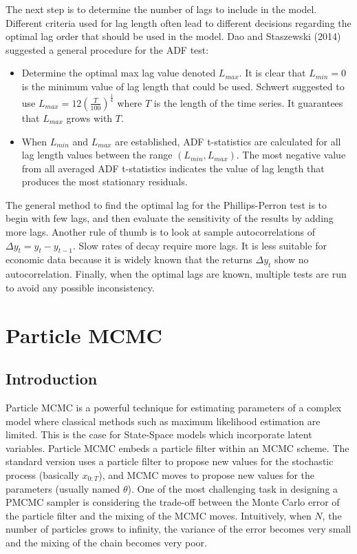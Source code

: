 \documentclass[11pt,a4,twosided,singlespacing,titlepagenumber=on]{scrreprt}
\numberwithin{equation}{chapter} %
\theoremstyle{remark}
\begin{document}
\noindent
The next step is to determine the number of lags to include in the model. Different criteria used for lag length often lead to different decisions regarding the optimal lag order that should be used in the model. Dao and Staszewski (2014) suggested a general procedure for the ADF test:
\begin{itemize}
\item Determine the optimal max lag value denoted $L_{max}$. It is clear that $L_{min} = 0$ is the minimum value of lag length that could be used. Schwert suggested to use $L_{max} = 12 \left(\frac{T}{100} \right)^{\frac{1}{4}}$ where $T$ is the length of the time series. It guarantees that $L_{max}$ grows with $T$.
\item When $L_{min}$ and $L_{max}$ are established, ADF t-statistics are calculated for all lag length values between the range $(L_{min}, L_{max})$. The most negative value from all averaged ADF t-statistics indicates the value of lag length that produces the most stationary residuals.
\end{itemize}
The general method to find the optimal lag for the Phillips-Perron test is to begin with few lags, and then evaluate the sensitivity of the results by adding more lags. Another rule of thumb is to look at sample autocorrelations of $\Delta y_t = y_t - y_{t-1}$. Slow rates of decay require more lags. It is less suitable for economic data because it is widely known that the returns $\Delta y_t$ show no autocorrelation. Finally, when the optimal lags are known, multiple tests are run to avoid any possible inconsistency.


\chapter{Particle MCMC}

\section{Introduction}
Particle MCMC is a powerful technique for estimating parameters of a complex model where classical methods such as maximum likelihood estimation are limited. This is the case for State-Space models which incorporate latent variables. Particle MCMC embeds a particle filter within an MCMC scheme. The standard version uses a particle filter to propose new values for the stochastic process (basically $x_{0:T}$), and MCMC moves to propose new values for the parameters (usually named $\theta$). One of the most challenging task in designing a PMCMC sampler is considering the trade-off between the Monte Carlo error of the particle filter and the mixing of the MCMC moves. Intuitively, when $N$, the number of particles grows to infinity, the variance of the error becomes very small and the mixing of the chain becomes very poor.
\end{document}
